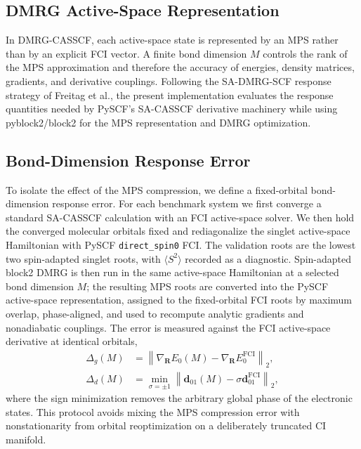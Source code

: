 \documentclass[journal=jctcce,manuscript=article]{achemso}
\newcommand{\bfR}{\mathbf{R}}
\begin{document}
\subsection{DMRG Active-Space Representation}

In DMRG-CASSCF, each active-space state is represented by an MPS rather than
by an explicit FCI vector.\cite{RommerOstlund1997MPS,WhiteMartin1999DMRG}
A finite bond dimension $M$ controls the rank of
the MPS approximation and therefore the accuracy of energies, density
matrices, gradients, and derivative couplings.  Following the SA-DMRG-SCF
response strategy of Freitag et al., the present implementation evaluates the
response quantities needed by PySCF's SA-CASSCF derivative machinery while
using pyblock2/block2 for the MPS representation and DMRG optimization.
\cite{Freitag2019,Zhai2023Block2}

\subsection{Bond-Dimension Response Error}

To isolate the effect of the MPS compression, we define a fixed-orbital
bond-dimension response error.  For each benchmark system we first converge a
standard SA-CASSCF calculation with an FCI active-space solver.  We then hold
the converged molecular orbitals fixed and rediagonalize the singlet
active-space Hamiltonian with PySCF \texttt{direct\_spin0} FCI.  The
validation roots are the lowest two spin-adapted singlet roots, with
$\langle S^2\rangle$ recorded as a diagnostic.  Spin-adapted block2 DMRG is
then run in
the same active-space Hamiltonian at a selected bond dimension $M$; the
resulting MPS roots are converted into the PySCF active-space representation,
assigned to the fixed-orbital FCI roots by maximum overlap, phase-aligned,
and used to recompute analytic gradients and nonadiabatic couplings.  The
error is measured against the FCI active-space derivative at identical
orbitals,
\begin{align}
\Delta_g(M) &= \left\|\nabla_{\bfR} E_0(M) -
              \nabla_{\bfR} E_0^{\mathrm{FCI}}\right\|_2,\\
\Delta_d(M) &= \min_{\sigma=\pm 1}
              \left\|\mathbf{d}_{01}(M) -
              \sigma \mathbf{d}_{01}^{\mathrm{FCI}}\right\|_2 ,
\end{align}
where the sign minimization removes the arbitrary global phase of the
electronic states.  This protocol avoids mixing the MPS compression error
with nonstationarity from orbital reoptimization on a deliberately truncated
CI manifold.
\end{document}
